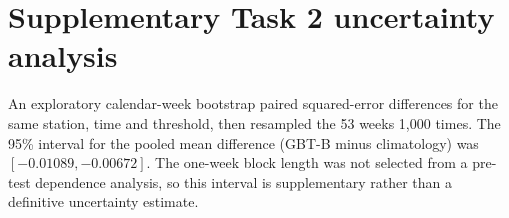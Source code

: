 \documentclass[11pt,a4paper]{article}
\begin{document}
\clearpage
\section{Supplementary Task 2 uncertainty analysis}
An exploratory calendar-week bootstrap paired squared-error differences for
the same station, time and threshold, then resampled the 53 weeks 1,000 times.
The 95\% interval for the pooled mean difference (GBT-B minus climatology) was
$[-0.01089,-0.00672]$. The one-week block length was not selected from a
pre-test dependence analysis, so this interval is supplementary rather than a
definitive uncertainty estimate.
\end{document}
